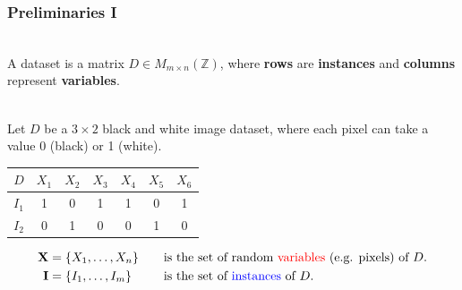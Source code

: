 \documentclass{beamer}
\newcommand{\mbf}[1]{\mathbf{#1}}
\begin{document}
\begin{frame}
  \frametitle{Preliminaries I}

  \begin{definition}[Dataset]~\\
    A dataset is a matrix $D\in M_{m\times n}(\mathbb{Z})$, where {\color{blue}\textbf{rows}} are
    {\color{blue}\textbf{instances}} and {\color{red}\textbf{columns}} represent
    {\color{red}\textbf{variables}}.
  \end{definition}

  \begin{example}~\\
    Let $D$ be a $3\times 2$ black and white image dataset, where each pixel can take a value 0
    (black) or 1 (white).

    \begin{table}
      \begin{tabular}{c|cccccc}
        $D$ & \color{red}$X_1$ & \color{red}$X_2$ & \color{red}$X_3$ & \color{red}$X_4$ &
        \color{red}$X_5$ & \color{red}$X_6$\\
        \hline
        \color{blue}$I_1$ & 1 & 0 & 1 & 1 & 0 & 1\\
        \color{blue}$I_2$ & 0 & 1 & 0 & 0 & 1 & 0\\
      \end{tabular}
    \end{table}\vspace{-0.5cm}
    \begin{align*}
      \mbf{X}&=\{X_1,\ldots,X_n\}\quad&\text{is}&\text{ the set of random {\color{red}variables}
      (e.g.  pixels) of $D$.}\\
      \mbf{I}&=\{I_1,\ldots,I_m\}\quad&\text{is}&\text{ the set of {\color{blue}instances} of $D$.}
    \end{align*}
  \end{example}

\end{frame}
\end{document}
